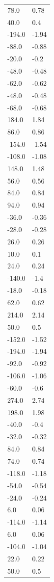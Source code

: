 \begin{longtable}{ll}
78.0 & 0.78 \\
40.0 & 0.4 \\
-194.0 & -1.94 \\
-88.0 & -0.88 \\
-20.0 & -0.2 \\
-48.0 & -0.48 \\
-62.0 & -0.62 \\
-48.0 & -0.48 \\
-68.0 & -0.68 \\
184.0 & 1.84 \\
86.0 & 0.86 \\
-154.0 & -1.54 \\
-108.0 & -1.08 \\
148.0 & 1.48 \\
56.0 & 0.56 \\
84.0 & 0.84 \\
94.0 & 0.94 \\
-36.0 & -0.36 \\
-28.0 & -0.28 \\
26.0 & 0.26 \\
10.0 & 0.1 \\
24.0 & 0.24 \\
-140.0 & -1.4 \\
-18.0 & -0.18 \\
62.0 & 0.62 \\
214.0 & 2.14 \\
50.0 & 0.5 \\
-152.0 & -1.52 \\
-194.0 & -1.94 \\
-92.0 & -0.92 \\
-106.0 & -1.06 \\
-60.0 & -0.6 \\
274.0 & 2.74 \\
198.0 & 1.98 \\
-40.0 & -0.4 \\
-32.0 & -0.32 \\
84.0 & 0.84 \\
74.0 & 0.74 \\
-118.0 & -1.18 \\
-54.0 & -0.54 \\
-24.0 & -0.24 \\
6.0 & 0.06 \\
-114.0 & -1.14 \\
6.0 & 0.06 \\
-104.0 & -1.04 \\
22.0 & 0.22 \\
50.0 & 0.5 \\

\end{longtable}
